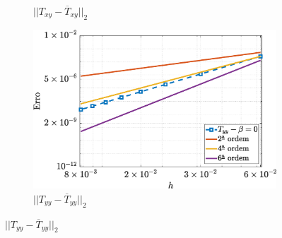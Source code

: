 \begin{figure}[H]
\begin{subfigure}[b]{.47\textwidth}
        \caption{$||T_{xy} - \overline{T}_{xy}||_{2}$}
        \label{error_txy_2nd_Case1_ucm}
    \end{subfigure}
    \qquad
    \begin{subfigure}[b]{.47\textwidth}
        \includegraphics[width=\textwidth]{figures/Case12/UCM/Errors/NormErr_2nd_Re_100_Wi_1_epsilon_0_xi_0_alphaG_0_Dt_1e-06_at_0.05_tipsim_1_MMS_12_Tyy.eps}
        \caption{$||T_{yy} - \overline{T}_{yy}||_{2}$}
        \label{error_tyy_2nd_Case1_ucm}
    \end{subfigure}
    \fdadospesquisa
\end{figure}

